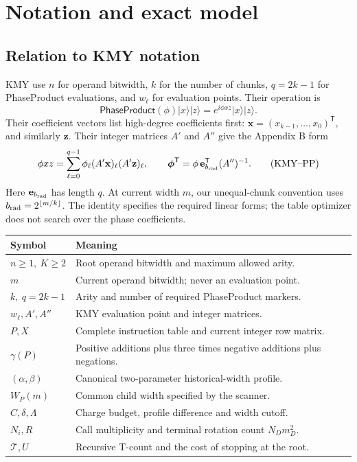 \documentclass[11pt,letterpaper]{article}
\newcommand{\PP}{\mathsf{PhaseProduct}}
\newcommand{\cost}{\mathcal T}
\begin{document}
\section{Notation and exact model}\label{sec:model}
\subsection{Relation to KMY notation}
KMY use \(n\) for operand bitwidth, \(k\) for the number of chunks,
\(q=2k-1\) for PhaseProduct evaluations, and \(w_\ell\) for evaluation
points. Their operation is \cite[Eq.~(10)]{kmy}
\[
\PP(\phi)\lvert x\rangle\lvert z\rangle
=e^{i\phi xz}\lvert x\rangle\lvert z\rangle.
\]
Their coefficient vectors list high-degree coefficients first:
\(\mathbf x=(x_{k-1},\ldots,x_0)^{\mathsf T}\), and similarly
\(\mathbf z\). Their integer matrices \(A'\) and \(A''\) give
the Appendix B form
\[
\phi xz=\sum_{\ell=0}^{q-1}\phi_\ell
(A'\mathbf x)_\ell(A'\mathbf z)_\ell,\qquad
\boldsymbol\phi^{\mathsf T}
=\phi\,\mathbf e_{b_{\rm rad}}^{\mathsf T}(A'')^{-1}.
\tag{KMY--PP}
\]
Here \(\mathbf e_{b_{\rm rad}}\) has length \(q\). At current width \(m\),
our unequal-chunk convention uses \(b_{\rm rad}=2^{\lfloor m/k\rfloor}\).
The identity specifies the required linear forms; the table optimizer
does not search over the phase coefficients.

\begin{longtable}{@{}p{}p{}@{}}
\toprule Symbol & Meaning\\ \midrule
\(n\ge1,\ K\ge2\)&Root operand bitwidth and maximum allowed arity.\\
\(m\)&Current operand bitwidth; never an evaluation point.\\
\(k,\ q=2k-1\)&Arity and number of required PhaseProduct markers.\\
\(w_\ell,A',A''\)&KMY evaluation point and integer matrices.\\
\(P,X\)&Complete instruction table and current integer row matrix.\\
\(\gamma(P)\)&Positive additions plus three times negative additions plus negations.\\
\((\alpha,\beta)\)&Canonical two-parameter historical-width profile.\\
\(W_P(m)\)&Common child width specified by the scanner.\\
\(C,\delta,\Lambda\)&Charge budget, profile difference and width cutoff.\\
\(N_i,R\)&Call multiplicity and terminal rotation count \(N_Dm_D^2\).\\
\(\cost,U\)&Recursive T-count and the cost of stopping at the root.\\
\bottomrule
\end{longtable}
\end{document}
